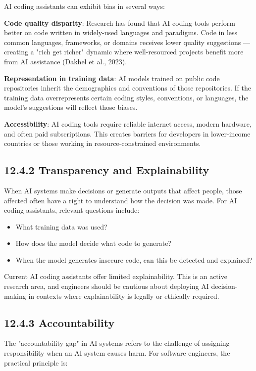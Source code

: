 \documentclass[11pt,a4paper]{book}
\begin{document}
AI coding assistants can exhibit bias in several ways:

\textbf{Code quality disparity}: Research has found that AI coding tools perform better on code written in widely-used languages and paradigms. Code in less common languages, frameworks, or domains receives lower quality suggestions --- creating a "rich get richer" dynamic where well-resourced projects benefit more from AI assistance (Dakhel et al., 2023).

\textbf{Representation in training data}: AI models trained on public code repositories inherit the demographics and conventions of those repositories. If the training data overrepresents certain coding styles, conventions, or languages, the model's suggestions will reflect those biases.

\textbf{Accessibility}: AI coding tools require reliable internet access, modern hardware, and often paid subscriptions. This creates barriers for developers in lower-income countries or those working in resource-constrained environments.

\subsection{12.4.2 Transparency and Explainability}

When AI systems make decisions or generate outputs that affect people, those affected often have a right to understand how the decision was made. For AI coding assistants, relevant questions include:

\begin{itemize}
  \item What training data was used?
  \item How does the model decide what code to generate?
  \item When the model generates insecure code, can this be detected and explained?
\end{itemize}

Current AI coding assistants offer limited explainability. This is an active research area, and engineers should be cautious about deploying AI decision-making in contexts where explainability is legally or ethically required.

\subsection{12.4.3 Accountability}

The "accountability gap" in AI systems refers to the challenge of assigning responsibility when an AI system causes harm. For software engineers, the practical principle is:
\end{document}

